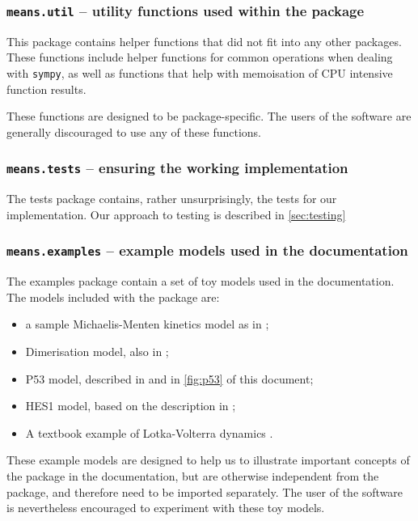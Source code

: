 \subsubsection{{\tt means.util} -- utility functions used within the package}
This package contains helper functions that did not fit into any other packages.
These functions include helper functions for common operations when dealing with \verb`sympy`,
as well as functions that help with memoisation of CPU intensive function results.

These functions are designed to be package-specific.
The users of the software are generally discouraged to use any of these functions.

\subsubsection{{\tt means.tests} -- ensuring the working implementation}
The tests package contains, rather unsurprisingly, the tests for our implementation.
Our approach to testing is described in \autoref{sec:testing}

\subsubsection{{\tt means.examples} -- example models used in the documentation}
The examples package contain a set of toy models used in the documentation.
The models included with the package are:
\begin{itemize}
    \item a sample Michaelis-Menten kinetics model as in \cite{ale_general_2013};
    \item Dimerisation model, also in \cite{ale_general_2013};
    \item P53 model, described in \cite{ale_general_2013} and in \autoref{fig:p53} of this document;
    \item HES1 model, based on the description in \cite{ale_general_2013} ;
    \item A textbook example of Lotka-Volterra dynamics .
\end{itemize}

These example models are designed to help us to illustrate important concepts of the package in the documentation, but are otherwise independent from the package, and therefore need to be imported separately.
The user of the software is nevertheless encouraged to experiment with these toy models.

